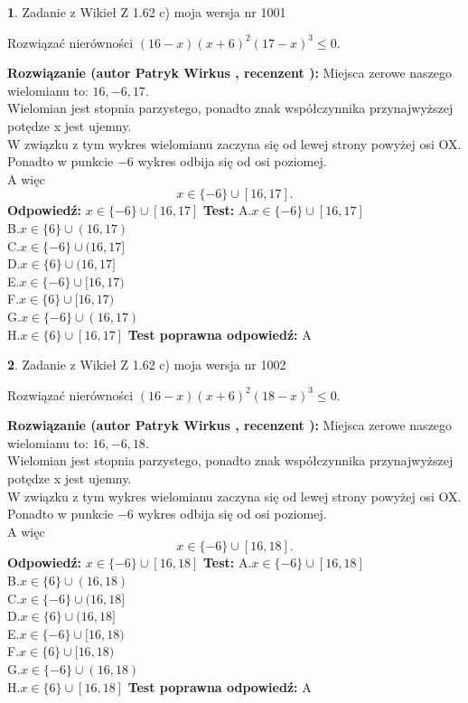 \documentclass[12pt, a4paper]{article}
\theoremstyle{definition} %
\newtheorem{zad}{}
\newcommand{\zadStart}[1]{\begin{zad}#1\newline}
\newcommand{\zadStop}{\end{zad}}
\newcommand{\rozwStart}[2]{\noindent \textbf{Rozwiązanie (autor #1 , recenzent #2): }\newline}
\newcommand{\rozwStop}{\newline}
\newcommand{\odpStart}{\noindent \textbf{Odpowiedź:}\newline}
\newcommand{\odpStop}{\newline}
\newcommand{\testStart}{\noindent \textbf{Test:}\newline}
\newcommand{\testStop}{\newline}
\newcommand{\kluczStart}{\noindent \textbf{Test poprawna odpowiedź:}\newline}
\newcommand{\kluczStop}{\newline}
\begin{document}
\zadStart{Zadanie z Wikieł Z 1.62 c) moja wersja nr 1001}

Rozwiązać nierówności $(16-x)(x+6)^{2}(17-x)^{3}\le0$.
\zadStop
\rozwStart{Patryk Wirkus}{}
Miejsca zerowe naszego wielomianu to: $16, -6, 17$.\\
Wielomian jest stopnia parzystego, ponadto znak współczynnika przy\linebreak najwyższej potędze x jest ujemny.\\ W związku z tym wykres wielomianu zaczyna się od lewej strony powyżej osi OX.\\
Ponadto w punkcie $-6$ wykres odbija się od osi poziomej.\\
A więc $$x \in \{-6\} \cup [16,17].$$
\rozwStop
\odpStart
$x \in \{-6\} \cup [16,17]$
\odpStop
\testStart
A.$x \in \{-6\} \cup [16,17]$\\
B.$x \in \{6\} \cup (16,17)$\\
C.$x \in \{-6\} \cup (16,17]$\\
D.$x \in \{6\} \cup (16,17]$\\
E.$x \in \{-6\} \cup [16,17)$\\
F.$x \in \{6\} \cup [16,17)$\\
G.$x \in \{-6\} \cup (16,17)$\\
H.$x \in \{6\} \cup [16,17]$
\testStop
\kluczStart
A
\kluczStop



\zadStart{Zadanie z Wikieł Z 1.62 c) moja wersja nr 1002}

Rozwiązać nierówności $(16-x)(x+6)^{2}(18-x)^{3}\le0$.
\zadStop
\rozwStart{Patryk Wirkus}{}
Miejsca zerowe naszego wielomianu to: $16, -6, 18$.\\
Wielomian jest stopnia parzystego, ponadto znak współczynnika przy\linebreak najwyższej potędze x jest ujemny.\\ W związku z tym wykres wielomianu zaczyna się od lewej strony powyżej osi OX.\\
Ponadto w punkcie $-6$ wykres odbija się od osi poziomej.\\
A więc $$x \in \{-6\} \cup [16,18].$$
\rozwStop
\odpStart
$x \in \{-6\} \cup [16,18]$
\odpStop
\testStart
A.$x \in \{-6\} \cup [16,18]$\\
B.$x \in \{6\} \cup (16,18)$\\
C.$x \in \{-6\} \cup (16,18]$\\
D.$x \in \{6\} \cup (16,18]$\\
E.$x \in \{-6\} \cup [16,18)$\\
F.$x \in \{6\} \cup [16,18)$\\
G.$x \in \{-6\} \cup (16,18)$\\
H.$x \in \{6\} \cup [16,18]$
\testStop
\kluczStart
A
\kluczStop
\end{document}
